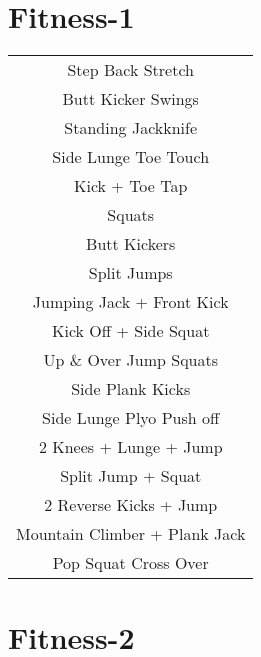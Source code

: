 \documentclass[12pt]{article}
\newcommand\myPadding{1.5}
\begin{document}

\section{Fitness-1}

\begin{center}
  \bgroup
  \def\arraystretch{\myPadding}%
  \begin{tabular}{ c  }
 Step Back Stretch
\\
Butt Kicker Swings
\\
Standing Jackknife
\\
Side Lunge Toe Touch
\\
Kick + Toe Tap
\\
Squats
\\
Butt Kickers
\\
Split Jumps
\\
Jumping Jack + Front Kick
\\
Kick Off + Side Squat
\\
Up \& Over Jump Squats
\\
Side Plank Kicks
\\
Side Lunge Plyo Push off
\\
2 Knees + Lunge + Jump
\\
Split Jump + Squat
\\
2 Reverse Kicks + Jump
\\
Mountain Climber + Plank Jack
\\
Pop Squat Cross Over
  \end{tabular}
  \egroup
\end{center}





\newpage


\section{Fitness-2}
\end{document}
